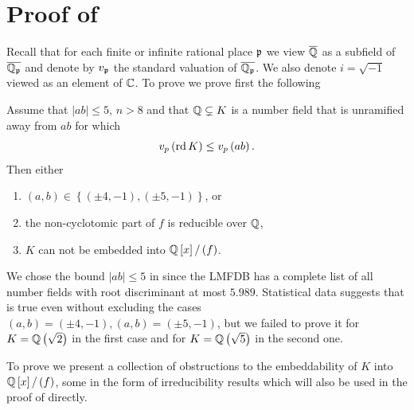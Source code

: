 \documentclass[../main.tex]{subfiles}
\begin{document}
\section{
  \label{sec:examples}
  Proof of 
}
Recall that for each finite or infinite rational place $\mathfrak{p}$ we view $\overline{\mathbb{Q}}$ as a subfield of $\overline{\mathbb{Q}_{\mathfrak{p}}}$ and denote by $v_{\mathfrak{p}}$ the standard valuation of $\overline{\mathbb{Q}_{\mathfrak{p}}}$.
We also denote $i = \sqrt{-1}$ viewed as an element of $\mathbb{C}$.
To prove  we prove first the following

\begin{proposition}
  \label{lem:fields_not_embeddable}
  Assume that $\left| ab \right| \leq 5$, $n > 8$ and that $\mathbb{Q} \subsetneq K$ is a number field that is unramified away from $ab$ for which 
  \[
    v_p\left( \operatorname{\rm rd} K \right) \leq v_p\left( ab \right).
  \]
  Then either 
  \begin{enumerate}
    \item $\left( a,b \right) \in \left\{ \left( \pm 4, -1 \right), \left( \pm 5, -1 \right) \right\}$, or
    \item the non-cyclotomic part of $f$ is reducible over $\mathbb{Q}$,
    \item $K$ can not be embedded into $\mathbb{Q}\left[ x \right]/ \left( f \right)$.
  \end{enumerate}
\end{proposition}
\begin{remark}
  We chose the bound $\left| ab \right| \leq 5$ in  since the LMFDB \cite{lmfdb} has a complete list of all number fields with root discriminant at most $5.989$.
  Statistical data suggests that  is true even without excluding the cases $\left( a,b \right) = \left( \pm4, -1 \right), \left( a,b \right) = \left( \pm 5, -1 \right)$, but we failed to prove it for $K = \mathbb{Q}\left( \sqrt{2} \right)$ in the first case and for $K = \mathbb{Q}\left( \sqrt{5} \right)$ in the second one.
\end{remark}

To prove  we present a collection of obstructions to the embeddability of $K$ into $\mathbb{Q}\left[ x \right]/ \left( f \right)$, some in the form of irreducibility results which will also be used in the proof of  directly.
\end{document}
